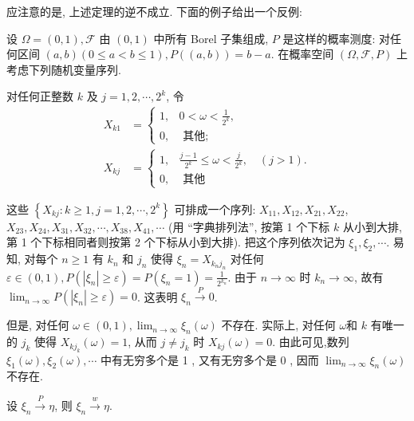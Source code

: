 应注意的是, 上述定理的逆不成立. 下面的例子给出一个反例: 

\begin{example}
    设 $\Omega=(0,1), \mathscr{F}$ 由 $(0,1)$ 中所有 Borel 子集组成, $P$ 是这样的概率测度: 对任何区间 $(a, b)(0 \leqslant a<b \leqslant 1), P((a, b))=b-a$. 在概率空间 $(\Omega, \mathscr{F}, P)$ 上考虑下列随机变量序列.

    对任何正整数 $k$ 及 $j=1,2, \cdots, 2^k$, 令
$$
\begin{aligned}
X_{k 1} & = \begin{cases}1, & 0<\omega<\frac{1}{2^k}, \\
0, & \text { 其他; }\end{cases} \\
X_{k j} & = \begin{cases}1, & \frac{j-1}{2^k} \leqslant \omega<\frac{j}{2^k}, \quad(j>1) . \\
0, & \text { 其他 }\end{cases}
\end{aligned}
$$

这些 $\left\{X_{k j}: k \geqslant 1, j=1,2, \cdots, 2^k\right\}$ 可排成一个序列: $X_{11}, X_{12}, X_{21}, X_{22}$, $X_{23}, X_{24}, X_{31}, X_{32}, \cdots, X_{38}, X_{41}, \cdots$ (用 “字典排列法”, 按第 1 个下标 $k$ 从小到大排, 第 1 个下标相同者则按第 2 个下标从小到大排). 把这个序列依次记为 $\xi_1, \xi_2, \cdots$. 易知, 对每个 $n \geqslant 1$ 有 $k_n$ 和 $j_n$ 使得 $\xi_n=X_{k_n j_n}$ 对任何 $\varepsilon \in(0,1), P\left(\left|\xi_n\right| \geqslant \varepsilon\right)=P\left(\xi_n=1\right)=\frac{1}{2^{k_n}}$. 由于 $n \rightarrow \infty$ 时 $k_n \rightarrow \infty$, 故有 $\lim _{n \rightarrow \infty} P\left(\left|\xi_n\right| \geqslant \varepsilon\right)=0$. 这表明 $\xi_n \stackrel{P}{\longrightarrow} 0$.

但是, 对任何 $\omega \in(0,1), \lim _{n \rightarrow \infty} \xi_n(\omega)$ 不存在. 实际上, 对任何 $\omega$和 $k$ 有唯一的 $j_k$ 使得 $X_{k j_k}(\omega)=1$, 从而 $j \neq j_k$ 时 $X_{k j}(\omega)=0$. 由此可见,数列 $\xi_1(\omega), \xi_2(\omega), \cdots$ 中有无穷多个是 1 , 又有无穷多个是 0 , 因而 $\lim _{n \rightarrow \infty} \xi_n(\omega)$ 不存在.
\end{example}

\begin{theorem}
    设 $\xi_n \stackrel{P}{\longrightarrow} \eta$, 则 $\xi_n \stackrel{w}{\longrightarrow} \eta$.
\end{theorem}

